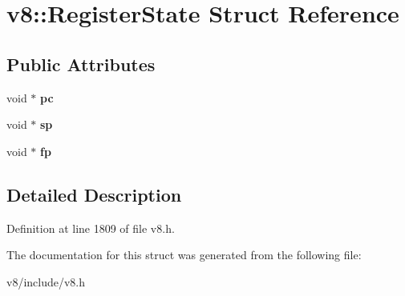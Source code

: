 \hypertarget{structv8_1_1RegisterState}{}\section{v8\+:\+:Register\+State Struct Reference}
\label{structv8_1_1RegisterState}
\subsection*{Public Attributes}
\begin{DoxyCompactItemize}
\item 
\mbox{\label{structv8_1_1RegisterState_aa0d0327871d9f95d5e64f47b7f183907}} 
void $\ast$ {\bfseries pc}
\item 
\mbox{\label{structv8_1_1RegisterState_a867bb9d0b9e81c3f7256aa81dc0daee4}} 
void $\ast$ {\bfseries sp}
\item 
\mbox{\label{structv8_1_1RegisterState_aaeb80a1d7f6df3ae418f3e9b1295d156}} 
void $\ast$ {\bfseries fp}
\end{DoxyCompactItemize}


\subsection{Detailed Description}


Definition at line 1809 of file v8.\+h.



The documentation for this struct was generated from the following file\+:\begin{DoxyCompactItemize}
\item 
v8/include/v8.\+h\end{DoxyCompactItemize}
